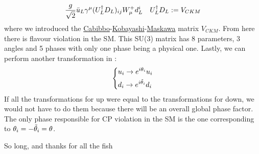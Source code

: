 \documentclass[../main.tex]{subfiles}
\begin{document}
\[
\frac{g}{\sqrt{2}}\Bar{u}_L\gamma^\mu(U_L^\dagger D_L)_{ij}W_\mu^+d_L^i \quad U_L^\dagger D_L:=V_{CKM}
\]
where we introduced the \href{https://en.wikipedia.org/wiki/Nicola_Cabibbo}{Cabibbo}-\href{https://en.wikipedia.org/wiki/Makoto_Kobayashi_(physicist)}{Kobayashi}-\href{https://en.wikipedia.org/wiki/Toshihide_Maskawa}{Maskawa} matrix $V_{CKM}$. From here there is flavour violation in the SM. This SU(3) matrix has 8 parameters, 3 angles and 5 phases with only one phase being a physical one. Lastly, we can perform another transformation in :
\[
\left\{
\begin{aligned}
&u_i\to e^{i\theta_i}u_i\\
&d_i\to e^{i\Tilde{\theta}_i}d_i
\end{aligned}
\right.
\]
If all the transformations for up were equal to the transformations for down, we would not have to do them because there will be an overall global phase factor. The only phase responsible for CP violation in the SM is the one corresponding to $\theta_i=-\Tilde{\theta}_i=\theta$.
\newpage
\vspace*{\fill}
\begin{center}
\begin{minipage}{\textwidth}
So long, and thanks for all the fish
\end{minipage}
\end{center}
\vfill %
\end{document}
